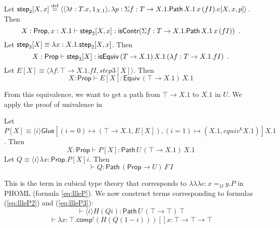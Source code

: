 \documentclass[a4paper,UKenglish]{lipics-v2016}
\newcommand*{\eqdef}{\mathrel{\smash{\stackrel{\text{def}}{=}}}}
\newcommand*{\triplelambda}{\ensuremath{\lambda \!\! \lambda \!\! \lambda}}
\newcommand{\Path}[3]{\ensuremath{\mathsf{Path} \, {#1} \, {#2} \, {#3}}}
\newcommand{\Prop}{\mathsf{Prop}}
\newcommand{\comp}{\mathsf{comp}}
\theoremstyle{plain}
\theoremstyle{definition}
\begin{document}
Let $\steptwo [X,x] \eqdef \langle \langle \lambda t : T.x, 1_{X.1} \rangle,
\lambda p : \Sigma f : T \rightarrow X.1. \Path{X.1}{x}{(fI)}. e[X, x, p] \rangle$.  Then
$$ X : \Prop, x : X.1 \vdash \steptwo [X, x] : \mathsf{isContr}(\Sigma f:T \rightarrow X.1. \Path{X.1}{x}{(fI)}) \enspace . $$
Let $\mathsf{step}_3 [X] \equiv \lambda x : X.1. \mathsf{step}_2 [X, x]$.  Then
$$ X : \Prop \vdash \stepthree [X] : \mathsf{isEquiv} \, (T \rightarrow X.1) \, X.1 \, (\lambda f : T \rightarrow X.1. f I) \enspace . $$
Let $E[X] \equiv \langle \lambda f : \top \rightarrow X.1. f I, step3[X] \rangle$.  Then
$$ X : \Prop \vdash E[X] : \mathsf{Equiv} \, (\top \rightarrow X.1) \, X.1 $$

From this equivalence, we want to get a path from $\top \rightarrow X.1$ to $X.1$ in $U$.  We apply the proof of univalence in \cite{cchm:cubical}

Let $P[X] \equiv \langle i \rangle \mathsf{Glue} [(i = 0) \mapsto (\top \rightarrow X.1, E[X]), (i = 1) \mapsto (X.1, equiv^k X.1)] X.1$.  Then
$$ X : \Prop \vdash P[X] : \Path{U}{(\top \rightarrow X.1)}{X.1} $$
Let $Q \equiv \langle i \rangle \lambda x : \Prop. P[X] i$.  Then
$$ \vdash Q : \Path{(\Prop \rightarrow U)}{F}{I} $$

This is the term in cubical type theory that corresponds to $\triplelambda e : x =_\Omega y.P$ in PHOML (formula \ref{eq:llleP}).  We now construct
terms corresponding to formulas (\ref{eq:llleP2}) and (\ref{eq:llleP3}):
$$ \vdash \langle i \rangle H (Q i) : \Path{U}{(\top \rightarrow \top)}{\top} $$
$$ \vdash \lambda x : \top. \comp^i (H (Q (1 - i))) [] x : \top \rightarrow \top \rightarrow \top $$
\end{document}
